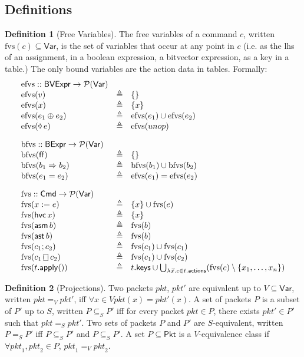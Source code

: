 \documentclass{article}
\newcommand{\pkt}{\mathit{pkt}}
\newcommand{\FALSE}{\mathsf{ff}}
\newcommand{\binop}{\mathbin{\oplus}}
\newcommand{\unop}{\mathop{\text{\pointer}}}
\newcommand{\BVExpr}{\mathsf{BVExpr}}
\newcommand{\BExpr}{\mathsf{BExpr}}
\newcommand{\Cmd}{\mathsf{Cmd}}
\newcommand{\Pkt}{\mathsf{Pkt}}
\newcommand{\Var}{\mathsf{Var}}
\newcommand{\actions}{\mathsf{actions}}
\newcommand{\keys}{\mathsf{keys}}
\newcommand{\assert}{\mathop{\mathsf{ast}}}
\newcommand{\assume}{\mathop{\mathsf{asm}}}
\newcommand{\apply}{\mathsf{apply}}
\newcommand{\choiceop}{\rotatebox[origin=c]{90}{$\sqsubset\!\!\!\sqsupset$}}
\newcommand{\choice}{\mathbin{\choiceop}}
\newcommand{\havoc}[1]{\mathop{\mathsf{hvc}}#1}
\newcommand{\fvs}{\textrm{fvs}}
\newcommand{\efvs}{\textrm{efvs}}
\newcommand{\bfvs}{\textrm{bfvs}}
\theoremstyle{plain}
\theoremstyle{definition}
\newtheorem{definition}{Definition}
\theoremstyle{remark}
\begin{document}
\subsection{Definitions}

\begin{definition}[Free Variables]
  The free variables of a command $c$, written $\fvs(c) \subseteq \Var$, is the
  set of variables that occur at any point in $c$ (i.e. as the lhs of an
  assignment, in a boolean expression, a bitvector expression, as a key in a
  table.) The only bound variables are the action data in tables. Formally:
  \[\begin{array}{l >{\triangleq}cl}
  \efvs :: \BVExpr \to \mathcal{P}(\Var) \\
  \efvs(v) && \{\} \\
  \efvs(x) && \{x\}\\
  \efvs(e_1 \binop e_2) && \efvs(e_1) \cup \efvs(e_2)\\
  \efvs(\unop e) && \efvs(unop) \\[1em]
  \bfvs :: \BExpr \to \mathcal{P}(\Var) \\
  \bfvs(\FALSE) && \{\}\\
  \bfvs(b_1 \Rightarrow b_2) && \bfvs(b_1) \cup \bfvs(b_2)\\
  \bfvs(e_1 = e_2) && \efvs(e_1) = \efvs(e_2) \\[1em]
  \fvs :: \Cmd \to \mathcal{P}(\Var) \\
  \fvs(x := e) && \{x\} \cup \fvs(e)\\
  \fvs(\havoc x) && \{x\}\\
  \fvs(\assume b) && \fvs(b)\\
  \fvs(\assert b) && \fvs(b) \\
  \fvs(c_1;c_2) && \fvs(c_1) \cup \fvs(c_1) \\
  \fvs(c_1 \choice c_2) && \fvs(c_1) \cup \fvs(c_2) \\
  \fvs(t.\apply()) &&
  t.\keys \cup \bigcup_{\lambda \vec x. c \in t.\actions} (\fvs(c) \setminus \{x_1,\ldots, x_n\})
  \end{array}\]
\end{definition}



\begin{definition}[Projections]
 Two packets $\pkt$, $\pkt'$ are equivalent up to $V \subseteq \Var$, written
 $\pkt =_V \pkt'$, iff $\forall x \in V \pkt(x) = \pkt'(x)$. A set of packets
 $P$ is a subset of $P'$ up to $S$, written $P \subseteq_S P'$ iff for every
 packet $\pkt \in P$, there exists $\pkt' \in P'$ such that $\pkt =_S \pkt'$.
 Two sets of packets $P$ and $P'$ are $S$-equivalent, written $P =_S P'$ iff $P
 \subseteq_S P'$ and $P \subseteq_S P'$. A set $P \subseteq \Pkt$ is a
 $V$-equivalence class if $\forall \pkt_1, \pkt_2 \in P$, $\pkt_1 =_V \pkt_2$.
\end{definition}
\end{document}
